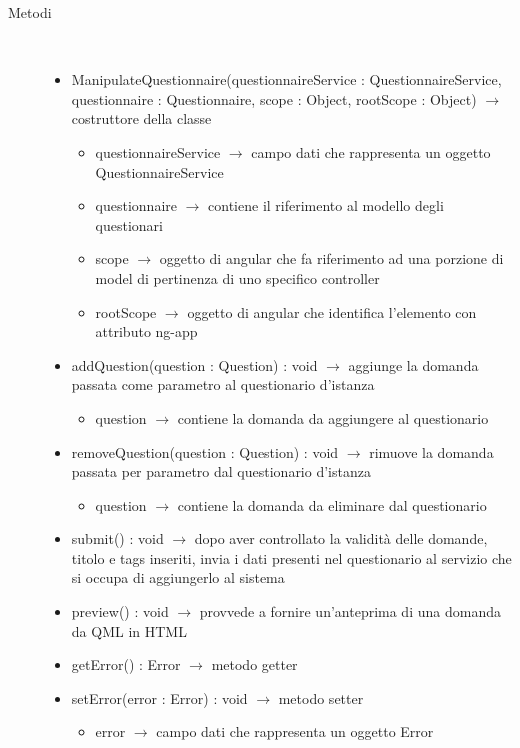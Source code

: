 \begin{description}
\item[Metodi] \hfill \\
\vspace{-7mm}
\begin{itemize}
	\item ManipulateQuestionnaire(questionnaireService : QuestionnaireService, questionnaire : Questionnaire, scope : Object, rootScope : Object) $\rightarrow$ costruttore della classe\begin{itemize}
		\item questionnaireService $\rightarrow$ campo dati che rappresenta un oggetto QuestionnaireService
		\item questionnaire $\rightarrow$ contiene il riferimento al modello degli questionari 
		\item scope $\rightarrow$ oggetto di angular che fa riferimento ad una porzione di model di pertinenza di uno specifico controller
		\item rootScope $\rightarrow$ oggetto di angular che identifica l’elemento con attributo ng-app
	\end{itemize}
	
	\item addQuestion(question : Question) : void $\rightarrow$ aggiunge la domanda passata come parametro al questionario d'istanza\begin{itemize}
		\item question $\rightarrow$ contiene la domanda da aggiungere al questionario 
	\end{itemize}
	
	\item removeQuestion(question : Question) : void $\rightarrow$ rimuove la domanda passata per parametro dal questionario d'istanza\begin{itemize}
		\item question $\rightarrow$ contiene la domanda da eliminare dal questionario 
	\end{itemize}
	
	\item submit() : void $\rightarrow$ dopo aver controllato la validità delle domande, titolo e tags inseriti, invia i dati presenti nel questionario al servizio che si occupa di aggiungerlo al sistema
	\item preview() : void $\rightarrow$ provvede a fornire un'anteprima di una domanda da QML in HTML
	\item getError() : Error $\rightarrow$ metodo getter
	\item setError(error : Error) : void $\rightarrow$ metodo setter\begin{itemize}
		\item error $\rightarrow$ campo dati che rappresenta un oggetto Error
	\end{itemize}
	

\end{itemize}
\end{description}
